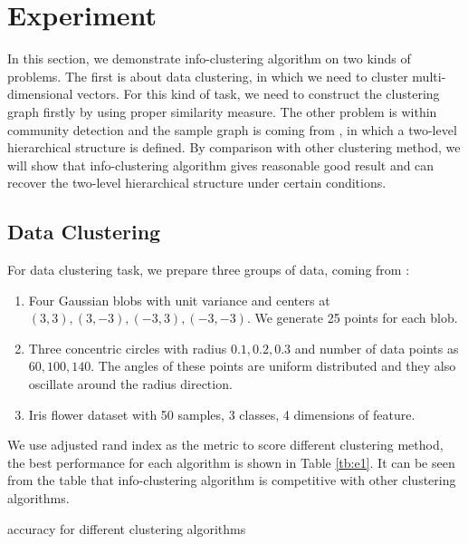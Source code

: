 \documentclass{article}
\begin{document}
\section{Experiment}\label{sec:experiment}
In this section, we demonstrate info-clustering algorithm on two kinds of problems. The first is about data clustering, in which we need to cluster multi-dimensional vectors. For this kind of task, we need to construct the clustering graph firstly by using proper similarity measure. The other problem is within community detection and the sample graph is coming from \cite{RN22}, in which a two-level hierarchical structure is defined. By comparison with other clustering method, we will show that info-clustering algorithm gives reasonable good result and can recover the two-level hierarchical structure under certain conditions. 

\subsection{Data Clustering}\label{sec:fc}
For data clustering task, we prepare three groups of data, coming from \cite{RN7}:
\begin{enumerate}
\item Four Gaussian blobs with unit variance and centers at $(3,3), (3,-3), (-3,3), (-3,-3)$.  We generate 25 points for each blob.
\item Three concentric circles with radius $0.1,0.2,0.3$ and number of data points as $60, 100, 140$. The angles of these points are uniform distributed and they also oscillate around the radius direction.
\item Iris flower dataset with 50 samples, 3 classes, 4 dimensions of feature.
\end{enumerate}
We use adjusted rand index as the metric to score different clustering method, the best performance for each algorithm is shown in Table \ref{tb:e1}.  It can be seen from the table that info-clustering algorithm is competitive with other clustering algorithms.
\begin{table}[!ht]
\centering
{}
\caption{ accuracy for different clustering algorithms }\label{tb:e1}
\end{table}
\end{document}
